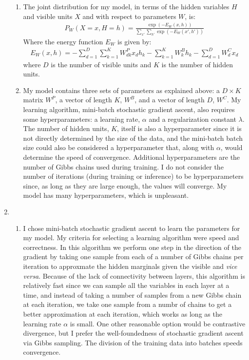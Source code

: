 \documentclass[12pt]{article}
\begin{document}
\begin{enumerate}
\begin{enumerate}
\item
The joint distribution for my model, in terms of the hidden variables $H$ and visible units $X$ and with respect to parameters $W$, is:
\begin{align*}
P_W(X=x,H=h) = \frac{\exp(-E_W(x,h))}{\sum_{x'}\sum_{h'}\exp(-E_W(x',h'))}
\end{align*}
Where the energy function $E_W$ is given by:
\begin{align*}
E_W(x,h) = -\sum_{d=1}^D\sum_{k=1}^KW^P_{dk}x_dh_k-\sum_{k=1}^KW^B_kh_k-\sum_{d=1}^DW^C_dx_d
\end{align*}
where $D$ is the number of visible units and $K$ is the number of hidden units.

\item
My model contains three sets of parameters as explained above: a $D\times K$ matrix $W^P$, a vector of length $K$, $W^B$, and a vector of length $D$, $W^C$. My learning algorithm, mini-batch stochastic gradient ascent, also requires some hyperparameters: a learning rate, $\alpha$ and a regularization constant $\lambda$. The number of hidden units, $K$, itself is also a hyperparameter since it is not directly determined by the size of the data, and the mini-batch batch size could also be considered a hyperparameter that, along with $\alpha$, would determine the speed of convergence. Additional hyperparameters are the number of Gibbs chains used during training. I do not consider the number of iterations (during training or inference) to be hyperparameters since, as long as they are large enough, the values will converge. My model has many hyperparameters, which is unpleasant.

\end{enumerate}

\item %
\begin{enumerate}
\item
I chose mini-batch stochastic gradient ascent to learn the parameters for my model. My criteria for selecting a learning algorithm were speed and correctness. In this algorithm we perform one step in the direction of the gradient by taking one sample from each of a number of Gibbs chains per iteration to approxmate the hidden marginals given the visible and \emph{vice versa}. Because of the lack of connectivity between layers, this algorithm is relatively fast since we can sample all the variables in each layer at a time, and instead of taking a number of samples from a new Gibbs chain at each iteration, we take one sample from a numbr of chains to get a better approximation at each iteration, which works as long as the learning rate $\alpha$ is small. One other reasonable option would be contrastive divergence, but I prefer the well-foundedness of stochastic gradient ascent via Gibbs sampling. The division of the training data into batches speeds convergence. 


\end{enumerate}
\end{enumerate}
\end{document}
